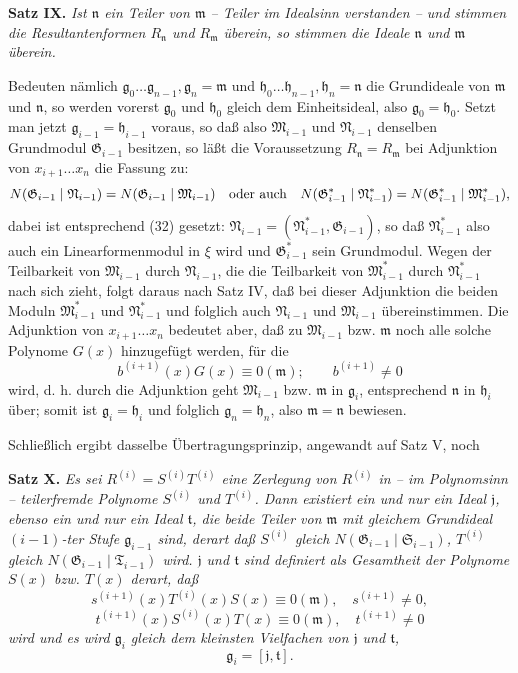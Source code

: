 \documentclass[11pt]{article}
\providecommand{\Gmod}{\mathfrak G}
\providecommand{\Mmod}{\mathfrak M}
\providecommand{\Nmod}{\mathfrak N}
\providecommand{\Smod}{\mathfrak S}
\providecommand{\mideal}{\mathfrak m}
\providecommand{\nideal}{\mathfrak n}
\providecommand{\gideal}{\mathfrak g}
\providecommand{\hideal}{\mathfrak h}
\providecommand{\jideal}{\mathfrak j}
\providecommand{\tideal}{\mathfrak t}
\begin{document}
\medskip
\noindent\textbf{Satz IX.} \emph{Ist $\nideal$ ein Teiler von $\mideal$ -- Teiler im Idealsinn verstanden -- und stimmen die Resultantenformen $R_\nideal$ und $R_\mideal$ überein, so stimmen die Ideale $\nideal$ und $\mideal$ überein.}

Bedeuten nämlich $\gideal_0\ldots\gideal_{n-1},\gideal_n=\mideal$ und $\hideal_0\ldots\hideal_{n-1},\hideal_n=\nideal$ die Grundideale von $\mideal$ und $\nideal$, so werden vorerst $\gideal_0$ und $\hideal_0$ gleich dem Einheitsideal, also $\gideal_0=\hideal_0$. Setzt man jetzt $\gideal_{i-1}=\hideal_{i-1}$ voraus, so daß also $\Mmod_{i-1}$ und $\Nmod_{i-1}$ denselben Grundmodul $\Gmod_{i-1}$ besitzen, so läßt die Voraussetzung $R_\nideal=R_\mideal$ bei Adjunktion von $x_{i+1}\ldots x_n$ die Fassung zu:
\[
 N(\Gmod_{i-1}\mid\Nmod_{i-1})=N(\Gmod_{i-1}\mid\Mmod_{i-1})
 \quad\hbox{oder auch}\quad
 N(\Gmod^*_{i-1}\mid\Nmod^*_{i-1})=N(\Gmod^*_{i-1}\mid\Mmod^*_{i-1}),
\]
dabei ist entsprechend (32) gesetzt: $\Nmod_{i-1}=(\Nmod^*_{i-1},\Gmod_{i-1})$, so daß $\Nmod^*_{i-1}$ also auch ein Linearformenmodul in $\xi$ wird und $\Gmod^*_{i-1}$ sein Grundmodul. Wegen der Teilbarkeit von $\Mmod_{i-1}$ durch $\Nmod_{i-1}$, die die Teilbarkeit von $\Mmod^*_{i-1}$ durch $\Nmod^*_{i-1}$ nach sich zieht, folgt daraus nach Satz IV, daß bei dieser Adjunktion die beiden Moduln $\Mmod^*_{i-1}$ und $\Nmod^*_{i-1}$ und folglich auch $\Nmod_{i-1}$ und $\Mmod_{i-1}$ übereinstimmen. Die Adjunktion von $x_{i+1}\ldots x_n$ bedeutet aber, daß zu $\Mmod_{i-1}$ bzw. $\mideal$ noch alle solche Polynome $G(x)$ hinzugefügt werden, für die
\[
 b^{(i+1)}(x)G(x)\equiv0(\mideal);
 \qquad b^{(i+1)}\ne0
\]
wird, d. h. durch die Adjunktion geht $\Mmod_{i-1}$ bzw. $\mideal$ in $\gideal_i$, entsprechend $\nideal$ in $\hideal_i$ über; somit ist $\gideal_i=\hideal_i$ und folglich $\gideal_n=\hideal_n$, also $\mideal=\nideal$ bewiesen.

Schließlich ergibt dasselbe Übertragungsprinzip, angewandt auf Satz V, noch

\medskip
\noindent\textbf{Satz X.} \emph{Es sei $R^{(i)}=S^{(i)}T^{(i)}$ eine Zerlegung von $R^{(i)}$ in -- im Polynomsinn -- teilerfremde Polynome $S^{(i)}$ und $T^{(i)}$. Dann existiert ein und nur ein Ideal $\jideal$, ebenso ein und nur ein Ideal $\tideal$, die beide Teiler von $\mideal$ mit gleichem Grundideal $(i-1)$-ter Stufe $\gideal_{i-1}$ sind, derart daß $S^{(i)}$ gleich $N(\Gmod_{i-1}\mid\Smod_{i-1})$, $T^{(i)}$ gleich $N(\Gmod_{i-1}\mid\mathfrak T_{i-1})$ wird. $\jideal$ und $\tideal$ sind definiert als Gesamtheit der Polynome $S(x)$ bzw. $T(x)$ derart, daß}
\[
 s^{(i+1)}(x)T^{(i)}(x)S(x)\equiv0(\mideal),\quad s^{(i+1)}\ne0,
\]
\[
 t^{(i+1)}(x)S^{(i)}(x)T(x)\equiv0(\mideal),\quad t^{(i+1)}\ne0
\]
\emph{wird und es wird $\gideal_i$ gleich dem kleinsten Vielfachen von $\jideal$ und $\tideal$,}
\[
 \gideal_i=[\jideal,\tideal].
\]
\end{document}
